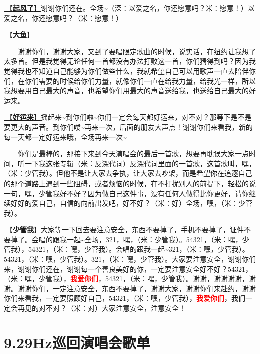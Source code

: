 \documentclass[]{ctexbook}
\begin{document}
\hyperref[the-wind-rises]{🎵【\textbf{起风了}】}谢谢你们还在。全场\textasciitilde（深：以爱之名，你还愿意吗？米：愿意！）以爱之名，你还愿意吗？（米：愿意！）

\hyperref[big-fish]{🎵【\textbf{大鱼}】}

  谢谢你们，谢谢大家，又到了要唱限定歌曲的时候，说实话，在纽约让我想了太多首。但是我觉得无论任何一首都没有办法打败这一首，你们猜得到吗？因为我觉得我也不知道自己能够为你们做些什么，我就希望自己可以用歌声一直去陪伴你们，在你们需要的时候给你们力量，就像你们一直在给我力量，给我光一样，所以我想要用自己最大的声音，也希望你们用最大的声音送给我，也送给自己最大的好运来。

\hyperref[good-luck-comes]{🎵【\textbf{好运来}】}摇起来\textasciitilde 到你们啦\textasciitilde 你们一定会每天都好运来，对不对？那等下是不是要更大的声音。到你们喽\textasciitilde 再来一次，后面的朋友大声点！谢谢你们来看我，新的每一天都一定好运来哦，全场再来一次\textasciitilde{}

  你们是最棒的，那接下来到今天演唱会的最后一首歌，想要再耽误大家一点时间，听一下我这张专辑（米：反深代词）反深代词里面的一首歌，这首歌叫，嘿，（米：少管我）。但他不是让大家去争执，让大家去吵架，而是希望你在追逐自己的那个道路上遇到一些阻碍，或者烦恼的时候，在不打扰别人的前提下，轻松的说一句，嘿，少管我好不好？因为做自己这件事，没有任何人做得比你更好，请你继续好好的爱自己，自信的向前出发吧，好不好？（米：好）全场，嘿，（米：少管我）。

\hyperref[watch-ur-manners]{🎵【\textbf{少管我}】}大家等一下回去要注意安全，东西不要掉了，手机不要掉了，证件不要掉了。会唱的跟我一起\textasciitilde 全场，321，嘿，（米：少管我）。54321，（米：嘿，少管我），54321，（米：嘿，少管我）。会唱的跟我一起\textasciitilde321，（米：嘿，少管我）。54321，（米：嘿，少管我）。321，（米：嘿，少管我）。大家要注意安全，谢谢你们来，谢谢你们还在，谢谢每一个善良美好的你，一定要注意安全好不好？54321，（米：嘿，少管我），\textbf{\textcolor{red}{我爱你们}}，54321，（米：嘿，少管我）。谢谢，谢谢谢谢，谢谢。谢谢你们，一定注意安全，东西不要掉了，谢谢大家，谢谢你们来赴约，谢谢你们来看我，一定要照顾好自己，54321，（米：嘿，少管我），\textbf{\textcolor{red}{我爱你们}}，我们一定会再见的对不对？（米：对）大家注意安全，注意安全！

\appendix {}


\chapter{9.29Hz巡回演唱会歌单}\label{playlists}
\end{document}
